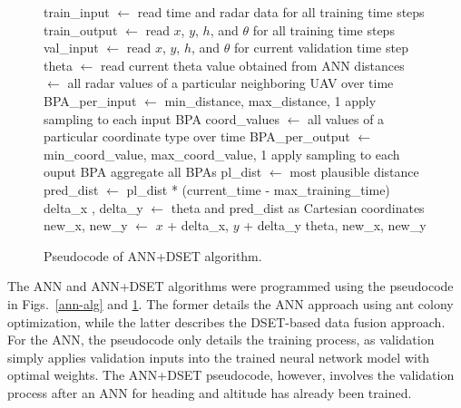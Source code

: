 \documentclass[12pt]{uthesis-v12}  %
\begin{document}
\begin{figure}
\begin{algorithmic}[1]
\STATE train\_input $\leftarrow$ read time and radar data for all training time steps
\STATE train\_output $\leftarrow$ read $x$, $y$, $h$, and $\theta$ for all training time steps
\STATE val\_input $\leftarrow$ read $x$, $y$, $h$, and $\theta$ for current validation time step
\STATE theta $\leftarrow$ read current theta value obtained from ANN
	\STATE distances $\leftarrow$ all radar values of a particular neighboring UAV over time
	\STATE BPA\_per\_input $\leftarrow$ min\_distance, max\_distance, 1
	\STATE apply sampling to each input BPA
\ENDFOR
{}
	\STATE coord\_values $\leftarrow$ all values of a particular coordinate type over time
	\STATE BPA\_per\_output $\leftarrow$ min\_coord\_value, max\_coord\_value, 1
	\STATE apply sampling to each ouput BPA	
\ENDFOR
\STATE aggregate all BPAs
\STATE pl\_dist $\leftarrow$ most plausible distance
\STATE pred\_dist $\leftarrow$ pl\_dist * (current\_time - max\_training\_time)
\STATE delta\_x , delta\_y $\leftarrow$ theta and pred\_dist as Cartesian coordinates
\STATE new\_x, new\_y $\leftarrow$ $x$ + delta\_x, $y$ + delta\_y
\RETURN theta, new\_x, new\_y
\label{dset-alg1}
\end{algorithmic}
\caption{Pseudocode of ANN+DSET algorithm.} \label{dset-alg}
\end{figure}

The ANN and ANN+DSET algorithms were programmed using the pseudocode in Figs.~\ref{ann-alg} and \ref{dset-alg}. The former details the ANN approach using ant colony optimization, while the latter describes the DSET-based data fusion approach. For the ANN, the pseudocode only details the training process, as validation simply applies validation inputs into the trained neural network model with optimal weights. The ANN+DSET pseudocode, however, involves the validation process after an ANN for heading and altitude has already been trained.
\end{document}
